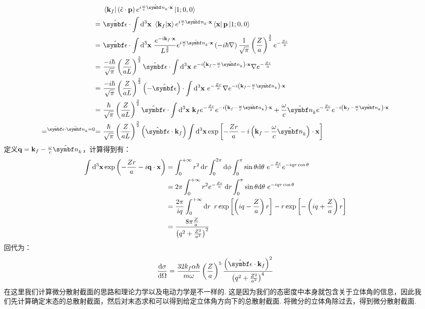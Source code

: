 \begin{align*}
& \bra{\vk_{f}}\br{\hat{\epsilon}\cdot\vp}e^{i\frac{\omega}{c}\uv{n}_{k}\cdot\vr}\ket{1;0,0} \\
=\ 
& \uv{\epsilon}\cdot\int\dd^{3}\vr\ \bra{\vk_{f}}\ket{\vr}e^{i\frac{\omega}{c}\uv{n}_{k}\cdot\vr}\bra{\vr}\vp\ket{1;0,0} \\
=\  
& \uv{\epsilon}\cdot\int\dd^{3}\vr\ \frac{e^{-i\vk_{f}\cdot\vr}}{L^{\frac{3}{2}}}e^{i\frac{\omega}{c}\uv{n}_{k}\cdot\vr}\br{-i\hh\nabla}\frac{1}{\sqrt{\pi}}\br{\frac{Z}{a}}^{\frac{3}{2}}e^{-\frac{Zr}{a}} \\
=\ 
& \frac{-i\hh}{\sqrt{\pi}}\br{\frac{Z}{aL}}^{\frac{3}{2}}\uv{\epsilon}\cdot\int\dd^{3}\vr\ e^{-i\br{\vk_{f} - \frac{\omega}{c}\uv{n}_{k}}\cdot\vr}\nabla e^{-\frac{Zr}{a}} \\
=\ 
& \frac{-i\hh}{\sqrt{\pi}}\br{\frac{Z}{aL}}^{\frac{3}{2}}\br{-\uv{\epsilon}}\cdot\int\dd^{3}\vr\ e^{-\frac{Zr}{a}}\nabla e^{-i\br{\vk_{f} - \frac{\omega}{c}\uv{n}_{k}}\cdot\vr} \\
=\ 
& \frac{\hh}{\sqrt{\pi}}\br{\frac{Z}{aL}}^{\frac{3}{2}}\uv{\epsilon}\cdot\int\dd^{3}\vr\ \vk_{f}e^{-\frac{Zr}{a}}e^{-i\br{\vk_{f} - \frac{\omega}{c}\uv{n}_{k}}\cdot\vr} + \frac{\omega}{c}\uv{n}_{k}e^{-\frac{Zr}{a}}e^{-i\br{\vk_{f} - \frac{\omega}{c}\uv{n}_{k}}\cdot\vr} \\
=^{\uv{\epsilon}\cdot\uv{n}_{k}=0}=\ 
& \frac{\hh}{\sqrt{\pi}}\br{\frac{Z}{aL}}^{\frac{3}{2}}\br{\uv{\epsilon}\cdot\vk_{f}}\int\dd^{3}\vr \exp\mbr{-\frac{Zr}{a}-i\br{\vk_{f}-\frac{\omega}{c}\uv{n}_{k}}\cdot\vr}
\end{align*}
定义\(\vq = \vk_{f} - \frac{\omega}{c}\uv{n}_{k}\)，计算得到有：
\begin{align*}
\int\dd^{3}\vr \exp\br{-\frac{Zr}{a}-i\vq\cdot\vr} 
& = \int_{0}^{+\infty}r^{2}\dd{r}\int_{0}^{2\pi}\dd\phi\int_{0}^{\pi}\sin\theta\dd\theta\ e^{-\frac{Zr}{a}}e^{-iqr\cos\theta} \\
& = 2\pi\int_{0}^{+\infty}r^{2}e^{-\frac{Zr}{a}}\dd{r}\int_{0}^{\pi}\sin\theta\dd\theta\ e^{-iqr\cos\theta} \\
& = \frac{2\pi}{iq}\int_{0}^{+\infty}\dd{r}\ r\exp\mbr{\br{iq-\frac{Z}{a}}r} - r\exp\mbr{-\br{iq+\frac{Z}{a}}r} \\
& = \frac{8\pi \frac{Z}{a}}{\br{q^{2} + \frac{Z^{2}}{a^{2}}}^{2}}
\end{align*}
回代为：
\[
\dOmega{\sigma} = \frac{32k_{f}\al\hh}{m\omega}\br{\frac{Z}{a}}^{5}\frac{\br{\uv{\epsilon}\cdot\vk_{f}}^{2}}{\br{q^{2} + \frac{Z^{2}}{a^{2}}}^{4}}
\]
在这里我们计算微分散射截面的思路和理论力学以及电动力学是不一样的. 这是因为我们的态密度中本身就包含关于立体角的信息，因此我们先计算确定末态的总散射截面，然后对末态求和可以得到给定立体角方向下的总散射截面. 将微分的立体角除过去，得到微分散射截面. 
